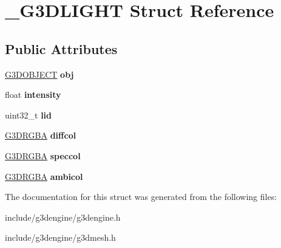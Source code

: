 \hypertarget{struct__G3DLIGHT}{}\section{\+\_\+\+G3\+D\+L\+I\+G\+HT Struct Reference}
\label{struct__G3DLIGHT}
\subsection*{Public Attributes}
\begin{DoxyCompactItemize}
\item 
\mbox{\label{struct__G3DLIGHT_a3ae550e2d6bf0207b8226fc11d6339ad}} 
\hyperlink{struct__G3DOBJECT}{G3\+D\+O\+B\+J\+E\+CT} {\bfseries obj}
\item 
\mbox{\label{struct__G3DLIGHT_a983d3fd20543f181c7107def63ee1083}} 
float {\bfseries intensity}
\item 
\mbox{\label{struct__G3DLIGHT_a3c48073472ebeaf458e22f79a9a69d74}} 
uint32\+\_\+t {\bfseries lid}
\item 
\mbox{\label{struct__G3DLIGHT_aaf8fc7406d5bc75fcb145b9f76d81378}} 
\hyperlink{struct__G3DRGBA}{G3\+D\+R\+G\+BA} {\bfseries diffcol}
\item 
\mbox{\label{struct__G3DLIGHT_a63432a527d6716b4dd3e73fe29b4b05f}} 
\hyperlink{struct__G3DRGBA}{G3\+D\+R\+G\+BA} {\bfseries speccol}
\item 
\mbox{\label{struct__G3DLIGHT_a40303133d27dee82b52b1a58c2c1f2ab}} 
\hyperlink{struct__G3DRGBA}{G3\+D\+R\+G\+BA} {\bfseries ambicol}
\end{DoxyCompactItemize}


The documentation for this struct was generated from the following files\+:\begin{DoxyCompactItemize}
\item 
include/g3dengine/g3dengine.\+h\item 
include/g3dengine/g3dmesh.\+h\end{DoxyCompactItemize}
